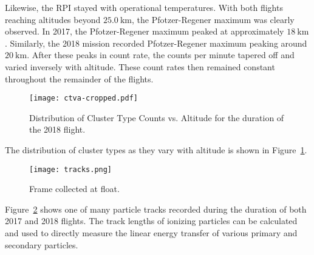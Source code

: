 Likewise, the RPI stayed with operational temperatures.
With both flights reaching altitudes beyond $\SI{25.0}{\kilo\meter}$, the Pfotzer-Regener maximum was clearly observed.  In 2017, the Pfotzer-Regener maximum peaked at approximately  $\SI{18}{\kilo\meter}$.  Similarly, the 2018 mission recorded Pfotzer-Regener maximum peaking around $\SI{20}{\kilo\meter}$. After these peaks in count rate, the counts per minute tapered off and varied inversely with altitude.  These count rates then remained constant throughout the remainder of the flights.
%
%
%
\begin{figure}[H]
\centering
\texttt{[image: ctva-cropped.pdf]}
\caption{Distribution of Cluster Type Counts vs. Altitude for the duration of the 2018 flight.}
\label{fig:cluster2018}
\end{figure}
The distribution of cluster types as they vary with altitude is shown in Figure~\ref{fig:cluster2018}.  
\begin{figure}[H]
\centering
\texttt{[image: tracks.png]}
\caption{Frame collected at float.}
\label{fig:frame1}
\end{figure}
Figure~\ref{fig:frame1} shows one of many particle tracks recorded during the duration of both 2017 and 2018 flights.  The track lengths of ionizing particles can be calculated and used to directly measure the linear energy transfer of various primary and secondary particles.


